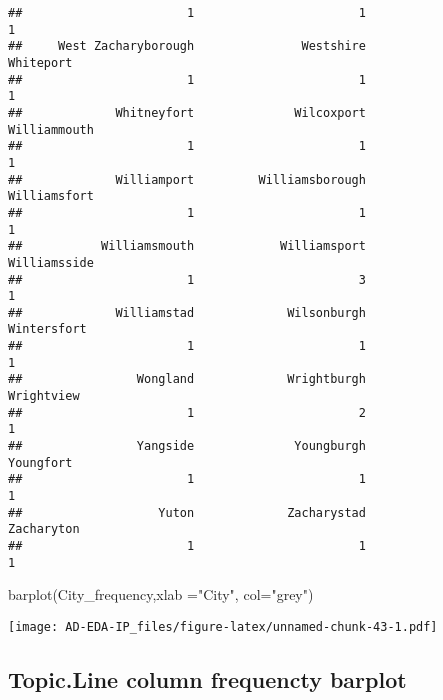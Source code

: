 \documentclass[
]{article}
\newenvironment{Shaded}{\begin{snugshade}}{\end{snugshade}}
\newcommand{\AttributeTok}[1]{\textcolor[rgb]{0.77,0.63,0.00}{#1}}
\newcommand{\FunctionTok}[1]{\textcolor[rgb]{0.00,0.00,0.00}{#1}}
\newcommand{\NormalTok}[1]{#1}
\newcommand{\OtherTok}[1]{\textcolor[rgb]{0.56,0.35,0.01}{#1}}
\newcommand{\SpecialCharTok}[1]{\textcolor[rgb]{0.00,0.00,0.00}{#1}}
\newcommand{\StringTok}[1]{\textcolor[rgb]{0.31,0.60,0.02}{#1}}
\begin{document}
\begin{verbatim}
##                       1                       1                       1 
##     West Zacharyborough               Westshire               Whiteport 
##                       1                       1                       1 
##             Whitneyfort              Wilcoxport            Williammouth 
##                       1                       1                       1 
##             Williamport         Williamsborough            Williamsfort 
##                       1                       1                       1 
##           Williamsmouth            Williamsport            Williamsside 
##                       1                       3                       1 
##             Williamstad             Wilsonburgh             Wintersfort 
##                       1                       1                       1 
##                Wongland             Wrightburgh              Wrightview 
##                       1                       2                       1 
##                Yangside              Youngburgh               Youngfort 
##                       1                       1                       1 
##                   Yuton             Zacharystad              Zacharyton 
##                       1                       1                       1
\end{verbatim}

\begin{Shaded}
\begin{Highlighting}[]
\FunctionTok{barplot}\NormalTok{(City\_frequency,}\AttributeTok{xlab =}\StringTok{"City"}\NormalTok{, }\AttributeTok{col=}\StringTok{"grey"}\NormalTok{)}
\end{Highlighting}
\end{Shaded}

\texttt{[image: AD-EDA-IP\_files/figure-latex/unnamed-chunk-43-1.pdf]}

\hypertarget{topic.line-column-frequencty-barplot}{%
\subsection{Topic.Line column frequencty
barplot}\label{topic.line-column-frequencty-barplot}}

\begin{Shaded}
\end{Shaded}
\end{document}
